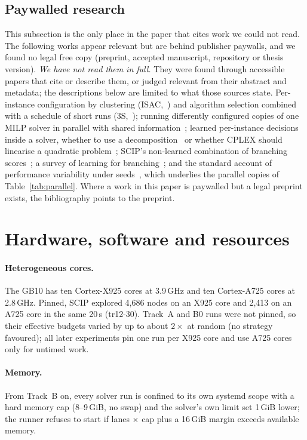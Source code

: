 \subsection{Paywalled research}\label{app:paywalled}
This subsection is the only place in the paper that cites work we could not read. The following works appear relevant but are behind publisher paywalls, and we
found no legal free copy (preprint, accepted manuscript, repository or thesis version). \emph{We have not read them in
full.} They were found through accessible papers that cite or describe them, or judged relevant from their abstract
and metadata; the descriptions below are limited to what those sources state. Per-instance configuration by clustering
(ISAC,~\citealp{kadioglu2010isac}) and algorithm selection combined with a schedule of short runs
(3S,~\citealp{kadioglu2011threes}); running differently configured copies of one MILP solver in parallel with shared
information~\citep{carvajal2014diversification}; learned per-instance decisions inside a solver, whether to use a
decomposition~\citep{kruber2017decomposition} or whether CPLEX should linearise a quadratic
problem~\citep{bonami2018miqp}; SCIP's non-learned combination of branching scores~\citep{achterberg2009hybrid}; a
survey of learning for branching~\citep{lodi2017survey}; and the standard account of performance variability under
seeds~\citep{lodi2013variability}, which underlies the parallel copies of Table~\ref{tab:parallel}. Where a work in this
paper is paywalled but a legal preprint exists, the bibliography points to the preprint.

\section{Hardware, software and resources}\label{app:resources}


\paragraph{Heterogeneous cores.} The GB10 has ten Cortex-X925 cores at 3.9\,GHz and ten Cortex-A725 cores at 2.8\,GHz.
Pinned, SCIP explored 4{,}686 nodes on an X925 core and 2{,}413 on an A725 core in the same 20\,s (tr12-30). Track~A
and B0 runs were not pinned, so their effective budgets varied by up to about $2\times$ at random (no strategy favoured);
all later experiments pin one run per X925 core and use A725 cores only for untimed work.

\paragraph{Memory.} From Track~B on, every solver run is confined to its own systemd scope with a hard memory cap
(8--9\,GiB, no swap) and the solver's own limit set 1\,GiB lower; the runner refuses to start if lanes $\times$ cap plus a
16\,GiB margin exceeds available memory.


